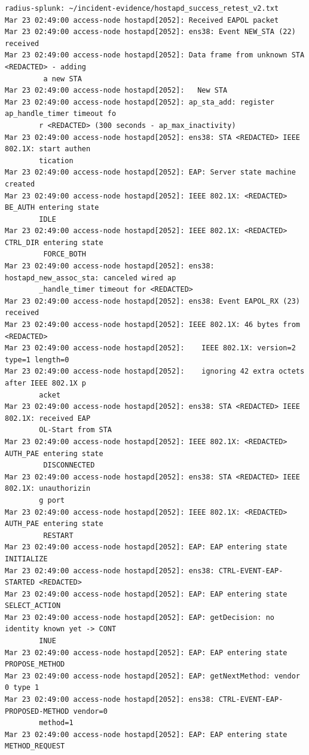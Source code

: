 \documentclass[11pt]{article}
\begin{document}
\begin{verbatim}
radius-splunk: ~/incident-evidence/hostapd_success_retest_v2.txt
Mar 23 02:49:00 access-node hostapd[2052]: Received EAPOL packet
Mar 23 02:49:00 access-node hostapd[2052]: ens38: Event NEW_STA (22) received
Mar 23 02:49:00 access-node hostapd[2052]: Data frame from unknown STA <REDACTED> - adding
         a new STA
Mar 23 02:49:00 access-node hostapd[2052]:   New STA
Mar 23 02:49:00 access-node hostapd[2052]: ap_sta_add: register ap_handle_timer timeout fo
        r <REDACTED> (300 seconds - ap_max_inactivity)
Mar 23 02:49:00 access-node hostapd[2052]: ens38: STA <REDACTED> IEEE 802.1X: start authen
        tication
Mar 23 02:49:00 access-node hostapd[2052]: EAP: Server state machine created
Mar 23 02:49:00 access-node hostapd[2052]: IEEE 802.1X: <REDACTED> BE_AUTH entering state 
        IDLE
Mar 23 02:49:00 access-node hostapd[2052]: IEEE 802.1X: <REDACTED> CTRL_DIR entering state
         FORCE_BOTH
Mar 23 02:49:00 access-node hostapd[2052]: ens38: hostapd_new_assoc_sta: canceled wired ap
        _handle_timer timeout for <REDACTED>
Mar 23 02:49:00 access-node hostapd[2052]: ens38: Event EAPOL_RX (23) received
Mar 23 02:49:00 access-node hostapd[2052]: IEEE 802.1X: 46 bytes from <REDACTED>
Mar 23 02:49:00 access-node hostapd[2052]:    IEEE 802.1X: version=2 type=1 length=0
Mar 23 02:49:00 access-node hostapd[2052]:    ignoring 42 extra octets after IEEE 802.1X p
        acket
Mar 23 02:49:00 access-node hostapd[2052]: ens38: STA <REDACTED> IEEE 802.1X: received EAP
        OL-Start from STA
Mar 23 02:49:00 access-node hostapd[2052]: IEEE 802.1X: <REDACTED> AUTH_PAE entering state
         DISCONNECTED
Mar 23 02:49:00 access-node hostapd[2052]: ens38: STA <REDACTED> IEEE 802.1X: unauthorizin
        g port
Mar 23 02:49:00 access-node hostapd[2052]: IEEE 802.1X: <REDACTED> AUTH_PAE entering state
         RESTART
Mar 23 02:49:00 access-node hostapd[2052]: EAP: EAP entering state INITIALIZE
Mar 23 02:49:00 access-node hostapd[2052]: ens38: CTRL-EVENT-EAP-STARTED <REDACTED>
Mar 23 02:49:00 access-node hostapd[2052]: EAP: EAP entering state SELECT_ACTION
Mar 23 02:49:00 access-node hostapd[2052]: EAP: getDecision: no identity known yet -> CONT
        INUE
Mar 23 02:49:00 access-node hostapd[2052]: EAP: EAP entering state PROPOSE_METHOD
Mar 23 02:49:00 access-node hostapd[2052]: EAP: getNextMethod: vendor 0 type 1
Mar 23 02:49:00 access-node hostapd[2052]: ens38: CTRL-EVENT-EAP-PROPOSED-METHOD vendor=0 
        method=1
Mar 23 02:49:00 access-node hostapd[2052]: EAP: EAP entering state METHOD_REQUEST

\end{verbatim}
\end{document}
